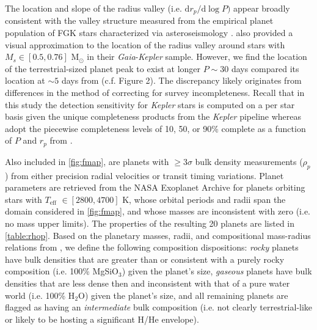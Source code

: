 \documentclass[twocolumn]{emulateapj}
\newcommand{\gaia}[1]{\emph{Gaia}#1}
\newcommand{\kepler}[1]{\emph{Kepler}#1}
\newcommand{\teff}[1]{$T_{\text{eff}}$#1}
\begin{document}
The location and slope of the radius valley (i.e. $\text{d}r_p/\text{d}\log{P})$ appear broadly consistent
with the valley structure measured from the empirical planet population of FGK stars characterized via
asteroseismology \citep{vaneylen18}. \cite{wu19} also provided a visual approximation to the location of the
radius valley around stars with $M_s \in [0.5,0.76]$ M$_{\odot}$ in their \gaia{-}\kepler{} sample. However,
we find the location of the terrestrial-sized planet peak to exist at longer $P \sim 30$ days compared its
location at $\sim 5$ days from \cite{wu19} (c.f. Figure 2). The discrepancy likely originates from differences
in the method of correcting for survey incompleteness.
Recall that in this study the detection sensitivity for \kepler{} stars is computed on a per star basis
given the unique completeness products from the \kepler{} pipeline whereas \cite{wu19} adopt the piecewise
completeness levels of 10, 50, or 90\% complete as a function of $P$ and $r_p$ from \cite{zhu18b}.

Also included in \autoref{fig:fmap}, are planets
with $\geq 3\sigma$ bulk density measurements ($\rho_p$) from either precision radial velocities or
transit timing variations.
Planet parameters are retrieved from the NASA Exoplanet Archive for planets orbiting stars with
\teff{} $\in[2800,4700]$ K, whose orbital periods and radii span the domain considered in \autoref{fig:fmap},
and whose masses are inconsistent with zero (i.e. no mass upper limits).
The properties of the resulting 20 planets are listed in \autoref{table:rhop}. Based on the
planetary masses, radii, and compositional mass-radius relations from \cite{zeng13},
we define the following composition dispositions: \emph{rocky}
planets have bulk densities that are greater than or consistent with a purely rocky composition
(i.e. 100\% MgSiO$_3$) given the planet's size, \emph{gaseous} planets have bulk densities that are less
dense then and inconsistent with that of a pure water world (i.e. 100\% H$_2$O) given the planet's size, 
and all remaining planets are flagged as having an \emph{intermediate} bulk composition (i.e. not clearly
terrestrial-like or likely to be hosting a significant H/He envelope).


\end{document}
